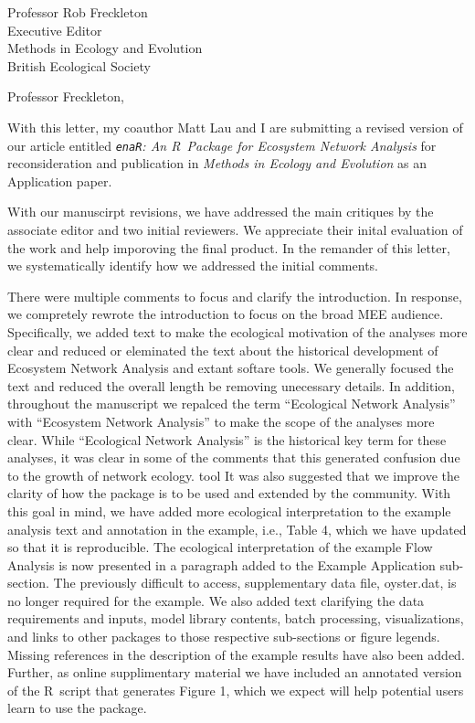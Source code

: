 \documentclass[letter]{letter}
\newcommand{\R}{R}
\begin{document}
\begin{letter}{Professor Rob Freckleton\\
Executive Editor\\
Methods in Ecology and Evolution\\
British Ecological Society
}

\opening{Professor Freckleton, }

With this letter, my coauthor Matt Lau and I are submitting a revised
version of our article entitled \emph{\texttt{enaR}: An \R\ Package
for Ecosystem Network Analysis} for reconsideration and publication in
\emph{Methods in Ecology and Evolution} as an Application paper.

With our manuscirpt revisions, we have addressed the main critiques by
the associate editor and two initial reviewers.  We appreciate their inital
evaluation of the work and help imporoving the final product.  In the
remander of this letter, we systematically identify how we addressed
the initial comments.

There were multiple comments to focus and clarify the introduction. In
response, we compretely rewrote the introduction to focus on the broad
MEE audience.  Specifically, we added text to make the ecological
motivation of the analyses more clear and reduced or eleminated the
text about the historical development of Ecosystem Network Analysis
and extant softare tools. We generally focused the text and reduced
the overall length be removing unecessary details.
In addition, throughout the manuscript we repalced the term
``Ecological Network Analysis'' with ``Ecosystem Network Analysis'' to
make the scope of the analyses more clear.  While ``Ecological
Network Analysis'' is the historical key term for these analyses, it
was clear in some of the comments that this generated confusion due to
the growth of network ecology.
tool
It was also suggested that we improve the clarity of how the package
is to be used and extended by the community. With this goal in mind,
we have added more ecological interpretation to the example analysis
text and annotation in the example, i.e., Table 4, which we have
updated so that it is reproducible. The ecological
interpretation of the example Flow Analysis is now presented in a
paragraph added to the Example Application sub-section. The previously
difficult to access, supplementary data file, oyster.dat, is no longer
required for the example. We also added text clarifying the data
requirements and inputs, model library contents, batch processing,
visualizations, and links to other packages to those respective
sub-sections or figure legends. Missing references in the description
of the example results have also been added.  Further, as online
supplimentary material we have included an annotated version of the
\R\ script that generates Figure 1, which we expect will help
potential users learn to use the package.


\end{letter}
\end{document}
